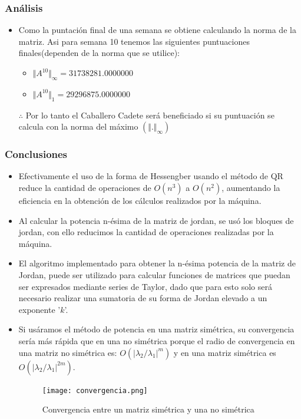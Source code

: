 \documentclass[utf8,spanish,xcolor={svgnames},12pt,handout]{beamer}
\begin{document}
\begin{frame}
	\frametitle{Análisis}
	\begin{itemize}
		\item Como la puntación final de una semana se obtiene calculando la norma de la matriz. Asi para semana 10 tenemos las siguientes puntuaciones finales(dependen de la norma que se utilice):
		\begin{itemize}
			\item $\Vert A^{10}\Vert_{\infty} = 31738281.0000000$
			\item $\Vert A^{10}\Vert_{1} = 29296875.0000000$
		\end{itemize}
		$\therefore$ Por lo tanto el Caballero Cadete será beneficiado si su puntuación se calcula con la norma del máximo $(\Vert .\Vert_{\infty})$
	\end{itemize}
\end{frame}

\begin{frame}
	\frametitle{Conclusiones}
	\begin{itemize}
		
		
		\item Efectivamente el uso de la forma de Hessengber usando el m\'etodo de QR reduce la cantidad de operaciones de $O(n^3)$ a $O(n^2)$, aumentando la eficiencia en la obtenci\'on de los c\'alculos realizados por la m\'aquina.
		\item Al calcular la potencia n-\'esima de la matriz de jordan, se usó los bloques de jordan, con ello reducimos la cantidad de operaciones realizadas por la m\'aquina.
		\item El algoritmo implementado para obtener la n-\'esima potencia de la matriz de Jordan, puede ser utilizado para calcular funciones de matrices que puedan ser expresados mediante series de Taylor, dado que para esto solo ser\'a necesario realizar una sumatoria de su forma de Jordan elevado a un exponente '$k$'.
	\end{itemize}
\end{frame}

\begin{frame}
	\begin{itemize}
		
		\item Si us\'aramos el m\'etodo de potencia en una matriz sim\'etrica, su convergencia sería más r\'apida que en una no sim\'etrica porque el radio de convergencia en una matriz no sim\'etrica es: $O(|\lambda_2/\lambda_1|^m)$
		y en una matriz sim\'etrica es $O(|\lambda_2/\lambda_1|^{2m})$.
		
		\begin{figure}
			\centering
			\texttt{[image: convergencia.png]}
			\caption{Convergencia entre un matriz sim\'etrica y una no sim\'etrica}
			\label{fig:my_label}
		\end{figure}
	\end{itemize}
\end{frame}
\end{document}
